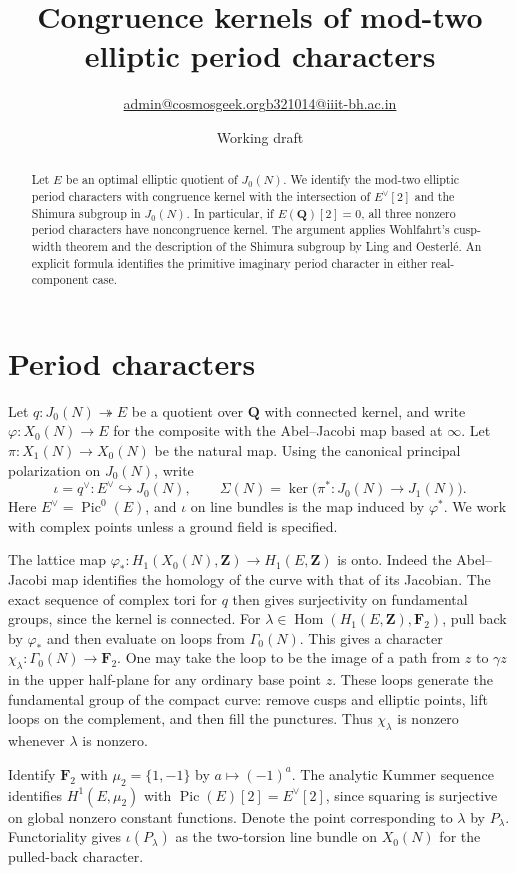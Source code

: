 \documentclass[11pt]{article}
\title{Congruence kernels of mod-two elliptic period characters}
\author{\small \href{mailto:admin@cosmosgeek.org}{admin@cosmosgeek.org}\qquad \href{mailto:b321014@iiit-bh.ac.in}{b321014@iiit-bh.ac.in}}
\date{Working draft}
\DeclareMathOperator{\Pic}{Pic}
\newcommand{\Z}{\mathbf Z}
\newcommand{\Q}{\mathbf Q}
\newcommand{\F}{\mathbf F}
\begin{document}
\maketitle

\begin{abstract}
Let \(E\) be an optimal elliptic quotient of \(J_0(N)\).
We identify the mod-two elliptic period characters with congruence kernel
with the intersection of \(E^\vee[2]\) and the Shimura subgroup in \(J_0(N)\).
In particular, if \(E(\Q)[2]=0\), all three nonzero period characters have
noncongruence kernel. The argument applies Wohlfahrt's cusp-width theorem and
the description of the Shimura subgroup by Ling and Oesterl\'e. An explicit
formula identifies the primitive imaginary period character in either
real-component case.
\end{abstract}

\section{Period characters}

Let \(q:J_0(N)\twoheadrightarrow E\) be a quotient over \(\Q\) with
connected kernel, and write \(\varphi:X_0(N)\to E\) for the composite with
the Abel--Jacobi map based at \(\infty\). Let \(\pi:X_1(N)\to X_0(N)\)
be the natural map. Using the canonical principal polarization on \(J_0(N)\),
write
\[
 \iota=q^\vee:E^\vee\hookrightarrow J_0(N),\qquad
 \Sigma(N)=\ker\big(\pi^*:J_0(N)\to J_1(N)\big).
\]
Here \(E^\vee=\Pic^0(E)\), and \(\iota\) on line bundles is the map induced
by \(\varphi^*\). We work with complex points unless a ground field is specified.

The lattice map \(\varphi_*:H_1(X_0(N),\Z)\to H_1(E,\Z)\) is onto.
Indeed the Abel--Jacobi map identifies the homology of the curve with that
of its Jacobian. The exact sequence of complex tori for \(q\) then gives
surjectivity on fundamental groups, since the kernel is connected.
For \(\lambda\in\operatorname{Hom}(H_1(E,\Z),\F_2)\), pull back by
\(\varphi_*\) and then evaluate on loops from \(\Gamma_0(N)\). This gives
a character \(\chi_\lambda:\Gamma_0(N)\to\F_2\). One may take the loop
to be the image of a path from \(z\) to \(\gamma z\) in the upper half-plane
for any ordinary base point \(z\). These loops generate the fundamental
group of the compact curve: remove cusps and elliptic points, lift loops
on the complement, and then fill the punctures. Thus \(\chi_\lambda\)
is nonzero whenever \(\lambda\) is nonzero.

Identify \(\F_2\) with \(\mu_2=\{1,-1\}\) by \(a\mapsto(-1)^a\).
The analytic Kummer sequence identifies \(H^1(E,\mu_2)\) with
\(\Pic(E)[2]=E^\vee[2]\), since squaring is surjective on global nonzero
constant functions. Denote the point corresponding to \(\lambda\) by
\(P_\lambda\). Functoriality gives \(\iota(P_\lambda)\) as the two-torsion
line bundle on \(X_0(N)\) for the pulled-back character.
\end{document}
